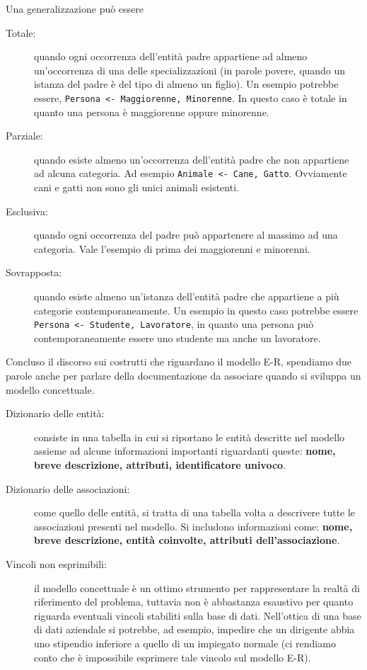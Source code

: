 \documentclass[12pt]{report}
\begin{document}
	Una generalizzazione può essere
	\begin{description}
		\item [Totale:] quando ogni occorrenza dell'entità padre appartiene ad almeno un'occorrenza di una delle specializzazioni (in parole povere, quando un istanza del padre è del tipo di almeno un figlio). Un esempio potrebbe essere, \texttt{Persona <- Maggiorenne, Minorenne}. In questo caso è totale in quanto una persona è maggiorenne oppure minorenne.
		
		\item[Parziale:] quando esiste almeno un'occorrenza dell'entità padre che non appartiene ad alcuna categoria. Ad esempio \texttt{Animale <- Cane, Gatto}. Ovviamente cani e gatti non sono gli unici animali esistenti.
		
		\item[Esclusiva:] quando ogni occorrenza del padre può appartenere al massimo ad una categoria. Vale l'esempio di prima dei maggiorenni e minorenni.
		
		\item[Sovrapposta:] quando esiste almeno un'istanza dell'entità padre che appartiene a più categorie contemporaneamente. Un esempio in questo caso potrebbe essere \texttt{Persona <- Studente, Lavoratore}, in quanto una persona può contemporaneamente essere uno studente ma anche un lavoratore.
	\end{description}
	
	Concluso il discorso sui costrutti che riguardano il modello E-R, spendiamo due parole anche per parlare della documentazione da associare quando si sviluppa un modello concettuale.
	
	\begin{description}
		\item [Dizionario delle entità:] consiste in una tabella in cui si riportano le entità descritte nel modello assieme ad alcune informazioni importanti riguardanti queste: \textbf{nome, breve descrizione, attributi, identificatore univoco}.
		
		\item[Dizionario delle associazioni:] come quello delle entità, si tratta di una tabella volta a descrivere tutte le associazioni presenti nel modello. Si includono informazioni come: \textbf{nome, breve descrizione, entità coinvolte, attributi dell'associazione}.
		
		\item[Vincoli non esprimibili:] il modello concettuale è un ottimo strumento per rappresentare la realtà di riferimento del problema, tuttavia non è abbastanza esaustivo per quanto riguarda eventuali vincoli stabiliti sulla base di dati. Nell'ottica di una base di dati aziendale si potrebbe, ad esempio, impedire che un dirigente abbia uno stipendio inferiore a quello di un impiegato normale (ci rendiamo conto che è impossibile esprimere tale vincolo sul modello E-R). 
	\end{description}
	
\end{document}

